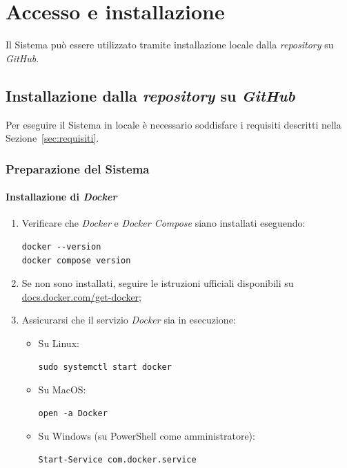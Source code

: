 \documentclass[10pt, letterpaper]{article}
\begin{document}
\section{Accesso e installazione}

Il Sistema può essere utilizzato tramite installazione locale dalla \textit{repository} su \textit{GitHub}.

\subsection{Installazione dalla \textit{repository} su \textit{GitHub}}
\label{sec:installazione-github}

Per eseguire il Sistema in locale è necessario soddisfare i requisiti descritti nella Sezione~\ref{sec:requisiti}.

\subsubsection{Preparazione del Sistema}

\paragraph{Installazione di \textit{Docker}}

\begin{enumerate}
    \item Verificare che \textit{Docker} e \textit{Docker Compose} siano installati eseguendo:
\begin{verbatim}
docker --version
docker compose version
\end{verbatim}
    \item Se non sono installati, seguire le istruzioni ufficiali disponibili su \href{https://docs.docker.com/get-docker/}{docs.docker.com/get-docker};
    \item Assicurarsi che il servizio \textit{Docker} sia in esecuzione:
    \begin{itemize}
      \item Su Linux: \begin{verbatim}sudo systemctl start docker\end{verbatim}
      \item Su MacOS: \begin{verbatim}open -a Docker\end{verbatim}
      \item Su Windows (su PowerShell come amministratore): \begin{verbatim}Start-Service com.docker.service\end{verbatim}
\end{itemize}
\end{enumerate}
\end{document}
